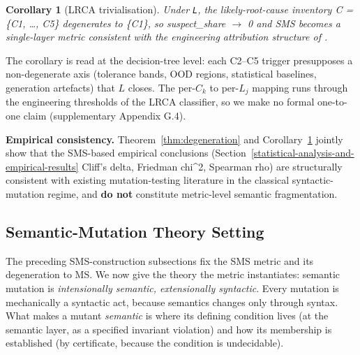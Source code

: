 \documentclass[review,12pt,authoryear]{elsarticle}
\newtheorem{corollary}[theorem]{Corollary}
\begin{document}
\begin{corollary}[LRCA trivialisation]\label{cor:lrca}
Under \texttt{L}, the
likely-root-cause inventory C = \{C1, \ldots, C5\} degenerates to
\{C1\}, so suspect\_share $\to$ 0 and SMS becomes a single-layer metric
consistent with the engineering attribution structure of
\citet{d7c38286734419b52de4262c9802ebdfcf4b9447}.
\end{corollary}

The corollary is read at the decision-tree level: each C2--C5 trigger
presupposes a non-degenerate axis (tolerance bands, OOD regions,
statistical baselines, generation artefacts) that $L$ closes. The
per-$C_k$ to per-$L_j$ mapping runs through the engineering thresholds
of the LRCA classifier, so we make no formal one-to-one claim
(supplementary Appendix G.4).

\textbf{Empirical consistency.} Theorem~\ref{thm:degeneration} and
Corollary~\ref{cor:lrca} jointly
show that the SMS-based empirical conclusions (Section~\ref{statistical-analysis-and-empirical-results} Cliff's delta,
Friedman chi\^{}2, Spearman rho) are structurally consistent with
existing mutation-testing literature in the classical syntactic-mutation
regime, and \textbf{do not} constitute metric-level semantic
fragmentation.


\subsection{Semantic-Mutation Theory Setting}\label{theory-setting}

The preceding SMS-construction subsections fix the SMS metric and its degeneration to MS. We now
give the theory the metric instantiates: semantic mutation is
\emph{intensionally semantic, extensionally syntactic}. Every mutation
is mechanically a syntactic act, because semantics changes only through
syntax. What makes a mutant \emph{semantic} is where its defining
condition lives (at the semantic layer, as a specified invariant
violation) and how its membership is established (by certificate,
because the condition is undecidable).
\end{document}
